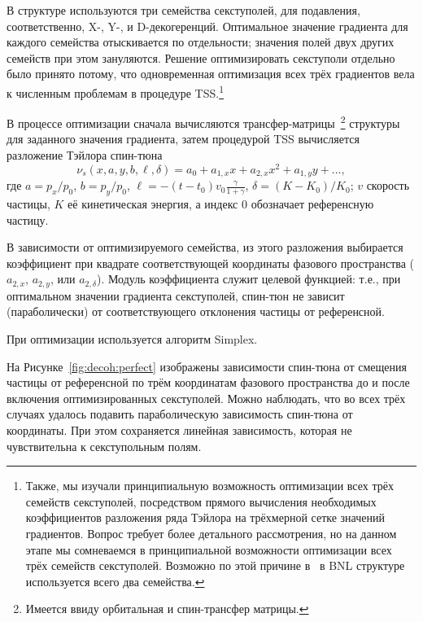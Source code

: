 В структуре используются три семейства секступолей, для подавления, соответственно, X-, Y-, и D-декогеренций.
Оптимальное значение градиента для каждого семейства отыскивается по отдельности; значения полей двух
других семейств при этом зануляются. Решение оптимизировать секступоли отдельно было принято потому, что
одновременная оптимизация всех трёх градиентов вела к численным проблемам в процедуре TSS.\footnote{Также,
мы изучали принципиальную возможность оптимизации всех трёх семейств секступолей, посредством прямого
вычисления необходимых коэффициентов разложения ряда Тэйлора на трёхмерной сетке значений градиентов. 
Вопрос требует более детального рассмотрения, но на данном этапе мы сомневаемся в принципиальной возможности
оптимизации всех трёх семейств секступолей. Возможно по этой причине в~\cite[стр.~219]{Eremey:Thesis} в BNL структуре
используется всего два семейства.}

В процессе оптимизации сначала вычисляются трансфер-матрицы~\footnote{Имеется ввиду орбитальная и
	 спин-трансфер матрицы.} структуры для заданного значения градиента, 
затем процедурой TSS вычисляется разложение Тэйлора спин-тюна 
\begin{equation*}
\nu_s(x,a,y,b,\ell,\delta) = a_0 + a_{1,x}x + a_{2,x}x^2 + a_{1,y}y + \dots,
\end{equation*}
где ${a = p_x/p_0}$, 
${b=p_y/p_0}$, 
${\ell = -(t-t_0)v_0\frac{\gamma}{1+\gamma}}$, 
${\delta = (K-K_0)/K_0}$; 
$v$ скорость частицы, $K$ её кинетическая энергия, 
а индекс 0 обозначает референсную частицу.~\cite[стр.~9]{COSYINF:Manual:BeamPhys}

В зависимости от оптимизируемого семейства, из этого разложения выбирается коэффициент 
при квадрате соответствующей координаты фазового пространства ($a_{2,x}$, $a_{2,y}$, или $a_{2,\delta}$). 
Модуль коэффициента служит целевой функцией: т.е., 
при оптимальном значении градиента секступолей, спин-тюн не зависит (параболически) от соответствующего отклонения частицы от референсной.

При оптимизации используется алгоритм Simplex.~\cite[стр.~37]{COSYINF:Manual:Programmer}

На Рисунке~\ref{fig:decoh:perfect} изображены зависимости спин-тюна от смещения частицы от референсной по трём
координатам фазового пространства до и после включения оптимизированных секступолей. 
Можно наблюдать, что во всех трёх случаях удалось подавить параболическую зависимость 
спин-тюна от координаты. При этом сохраняется линейная зависимость, 
которая не чувствительна к секступольным полям. 


